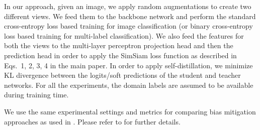\documentclass[10pt,twocolumn,letterpaper]{article}
\begin{document}
In our approach, given an image, we apply random augmentations to create two different views. We feed them to the backbone network and perform the standard cross-entropy loss based training for image classification (or binary cross-entropy loss based training for multi-label classification). We also feed the features for both the views to the multi-layer perceptron projection head and then the prediction head in order to apply the SimSiam loss function as described in Eqs.~1, 2, 3, 4 in the main paper. In order to apply self-distillation, we minimize KL divergence between the logits/soft predictions of the student and teacher networks. For all the experiments, the domain labels are assumed to be available during training time. 

We use the same experimental settings and metrics for comparing bias mitigation approaches as used in \cite{wang2020towards}. Please refer to \cite{wang2020towards} for further details.
\end{document}
